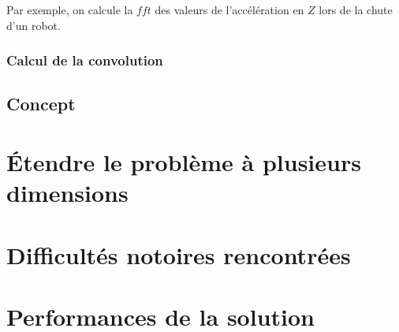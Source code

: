 Par exemple, on calcule la $fft$ des valeurs de l'accélération en $Z$ lors de la chute d'un robot.  

\subsubsection{Calcul de la convolution}
\label{Automatisation du processus d'investigation: Reconnaissance de motifs: Différentes approches étudiées: Calcul de la convolution}

\subsection{Concept}
\label{Automatisation du processus d'investigation: Reconnaissance de motifs: Concept}


\section{Étendre le problème à plusieurs dimensions }
\label{Automatisation du processus d'investigation: Étendre le problème à plusieurs dimensions}



\section{Difficultés notoires rencontrées}
\label{Automatisation du processus d'investigation: Difficultés notoires rencontrées}

\section{Performances de la solution}
\label{Industrialisation du produit: Performances de la solution}


